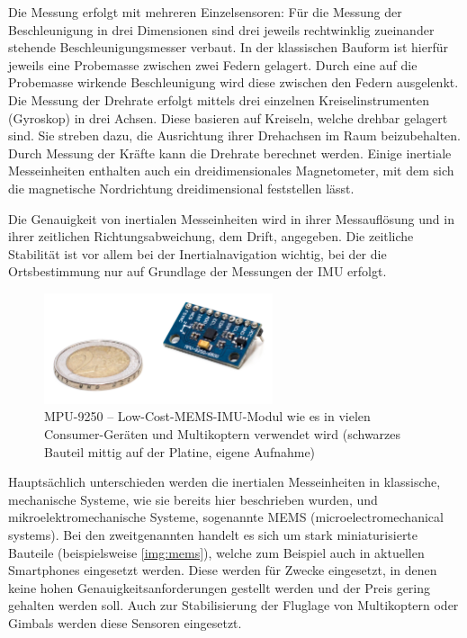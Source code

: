 \documentclass[a4paper,12pt,bibliography=totoc, listof=totoc,titlepage,pointlessnumbers]{scrreprt}
\begin{document}
Die Messung erfolgt mit mehreren Einzelsensoren: Für die Messung der Beschleunigung in drei Dimensionen sind drei jeweils rechtwinklig zueinander stehende Beschleunigungsmesser verbaut. In der klassischen Bauform ist hierfür jeweils eine Probemasse zwischen zwei Federn gelagert. Durch eine auf die Probemasse wirkende Beschleunigung wird diese zwischen den Federn ausgelenkt. Die Messung der Drehrate erfolgt mittels drei einzelnen Kreiselinstrumenten (Gyroskop) in drei Achsen. Diese basieren auf Kreiseln, welche drehbar gelagert sind. Sie streben dazu, die Ausrichtung ihrer Drehachsen im Raum beizubehalten. Durch Messung der Kräfte kann die Drehrate berechnet werden. Einige inertiale Messeinheiten enthalten auch ein dreidimensionales Magnetometer, mit dem sich die magnetische Nordrichtung dreidimensional feststellen lässt. \citep[S. 10]{willemsen}

Die Genauigkeit von inertialen Messeinheiten wird in ihrer Messauflösung und in ihrer zeitlichen Richtungsabweichung, dem Drift, angegeben. Die zeitliche Stabilität ist vor allem bei der Inertialnavigation wichtig, bei der die Ortsbestimmung nur auf Grundlage der Messungen der IMU erfolgt.

\begin{figure}[!ht]
 \centering
 \includegraphics[width=0.6\textwidth]{./img/mems.jpg}
 \caption{MPU-9250 -- Low-Cost-MEMS-IMU-Modul wie es in vielen Consumer-Geräten und Multikoptern verwendet wird (schwarzes Bauteil mittig auf der Platine, eigene Aufnahme)}
 \label{img:mems}
\end{figure}

Hauptsächlich unterschieden werden die inertialen Messeinheiten in klassische, mechanische Systeme, wie sie bereits hier beschrieben wurden, und mikroelektromechanische Systeme, sogenannte MEMS (microelectromechanical systems). Bei den zweitgenannten handelt es sich um stark miniaturisierte Bauteile (beispielsweise \autoref{img:mems}), welche zum Beispiel auch in aktuellen Smartphones eingesetzt werden. Diese werden für Zwecke eingesetzt, in denen keine hohen Genauigkeitsanforderungen gestellt werden und der Preis gering gehalten werden soll. Auch zur Stabilisierung der Fluglage von Multikoptern oder Gimbals werden diese Sensoren eingesetzt. \citep[S. 9f]{willemsen}
\end{document}
